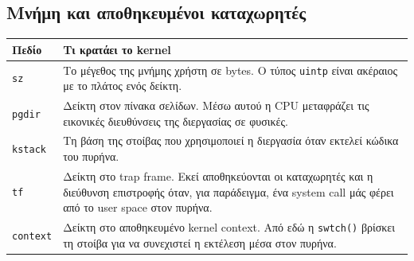 \documentclass[11pt,a4paper]{article}
\begin{document}
\subsection*{Μνήμη και αποθηκευμένοι καταχωρητές}
\begingroup\small
\begin{tabularx}{\textwidth}{@{}l X@{}}
\toprule
\textbf{Πεδίο} & \textbf{Τι κρατάει το kernel} \\
\midrule
\texttt{sz} & Το μέγεθος της μνήμης χρήστη σε bytes. Ο τύπος \texttt{uintp} είναι ακέραιος με το πλάτος ενός δείκτη. \\
\texttt{pgdir} & Δείκτη στον πίνακα σελίδων. Μέσω αυτού η CPU μεταφράζει τις εικονικές διευθύνσεις της διεργασίας σε φυσικές. \\
\texttt{kstack} & Τη βάση της στοίβας που χρησιμοποιεί η διεργασία όταν εκτελεί κώδικα του πυρήνα. \\
\texttt{tf} & Δείκτη στο trap frame. Εκεί αποθηκεύονται οι καταχωρητές και η διεύθυνση επιστροφής όταν, για παράδειγμα, ένα system call μάς φέρει από το user space στον πυρήνα. \\
\texttt{context} & Δείκτη στο αποθηκευμένο kernel context. Από εδώ η \texttt{swtch()} βρίσκει τη στοίβα για να συνεχιστεί η εκτέλεση μέσα στον πυρήνα. \\
\bottomrule
\end{tabularx}
\endgroup

\clearpage
\end{document}
